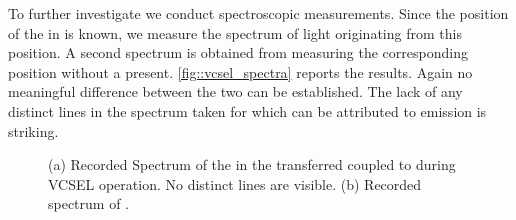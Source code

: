 		To further investigate we conduct spectroscopic measurements. Since the position of the \nd in \BmFour is known, we measure the spectrum of light originating from this position. A second spectrum is obtained from \BmTwo measuring the corresponding position without a \nd present. \autoref{fig::vcsel_spectra} reports the results. Again no meaningful difference between the two \VCSELs can be established. The lack of any distinct lines in the spectrum taken for \BmFour{} which can be attributed to \siv emission is striking.

			\begin{figure}[htp]
				\begin{subfigure}[t]{ 0.49\linewidth}
					\centering
					\caption{}
					\label{subfig::spectrum_vcsel_excitation_with_diamond}
				\end{subfigure}
				\hfill
				\begin{subfigure}[t]{ 0.49\linewidth}
					\centering
					\caption{}
					\label{subfig::spectrum_vcsel_excitation_without_diamond}
				\end{subfigure}
				\caption[Comparison of spectra between \BmFour and \BmTwo]{(a) Recorded Spectrum of the \siv in the transferred \nd coupled to \BmFour during VCSEL operation. No distinct \siv lines are visible. (b) Recorded spectrum of \BmTwo.}
				\label{fig::vcsel_spectra}
			\end{figure}

